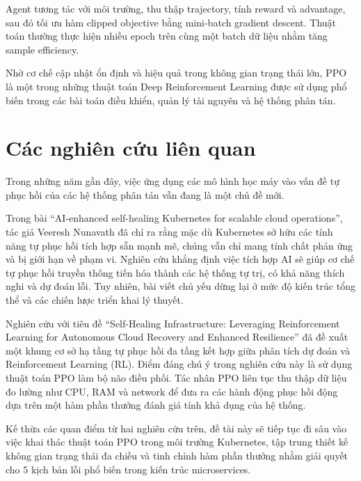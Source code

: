 Agent tương tác với môi trường, thu thập trajectory, tính reward và advantage, sau đó tối ưu hàm clipped objective bằng mini-batch gradient descent. Thuật toán thường thực hiện nhiều epoch trên cùng một batch dữ liệu nhằm tăng sample efficiency.

Nhờ cơ chế cập nhật ổn định và hiệu quả trong không gian trạng thái lớn, PPO là một trong những thuật toán Deep Reinforcement Learning được sử dụng phổ biến trong các bài toán điều khiển, quản lý tài nguyên và hệ thống phân tán.


\section{Các nghiên cứu liên quan}

Trong những năm gần đây, việc ứng dụng các mô hình học máy vào vấn đề tự phục hồi của các hệ thống phân tán vẫn đang là một chủ đề mới.

Trong bài ``AI-enhanced self-healing Kubernetes for scalable cloud operations'', tác giả Veeresh Nunavath đã chỉ ra rằng mặc dù Kubernetes sở hữu các tính năng tự phục hồi tích hợp sẵn mạnh mẽ, chúng vẫn chỉ mang tính chất phản ứng và bị giới hạn về phạm vi. Nghiên cứu khẳng định việc tích hợp AI sẽ giúp cơ chế tự phục hồi truyền thống tiến hóa thành các hệ thống tự trị, có khả năng thích nghi và dự đoán lỗi. Tuy nhiên, bài viết chủ yếu dừng lại ở mức độ kiến trúc tổng thể và các chiến lược triển khai lý thuyết.

Nghiên cứu với tiêu đề ``Self-Healing Infrastructure: Leveraging Reinforcement Learning for Autonomous Cloud Recovery and Enhanced Resilience'' đã đề xuất một khung cơ sở hạ tầng tự phục hồi đa tầng kết hợp giữa phân tích dự đoán và Reinforcement Learning (RL). Điểm đáng chú ý trong nghiên cứu này là sử dụng thuật toán PPO làm bộ não điều phối. Tác nhân PPO liên tục thu thập dữ liệu đo lường như CPU, RAM và network để đưa ra các hành động phục hồi động dựa trên một hàm phần thưởng đánh giá tính khả dụng của hệ thống.

Kế thừa các quan điểm từ hai nghiên cứu trên, đề tài này sẽ tiếp tục đi sâu vào việc khai thác thuật toán PPO trong môi trường Kubernetes, tập trung thiết kế không gian trạng thái đa chiều và tinh chỉnh hàm phần thưởng nhằm giải quyết cho 5 kịch bản lỗi phổ biến trong kiến trúc microservices.
